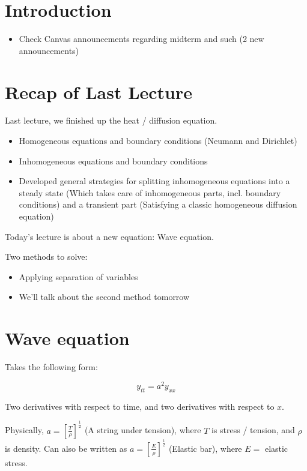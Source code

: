 \graphicspath{{./Lecture11/}}

\section{Introduction}

\begin{itemize}
    \item Check Canvas announcements regarding midterm and such (2 new announcements)
\end{itemize}

\section{Recap of Last Lecture}

Last lecture, we finished up the heat / diffusion equation. 

\begin{itemize}
    \item Homogeneous equations and boundary conditions (Neumann and Dirichlet)
    \item Inhomogeneous equations and boundary conditions
    \item Developed general strategies for splitting inhomogeneous equations into a steady state (Which takes care of inhomogeneous parts, incl. boundary conditions) and a transient part (Satisfying a classic homogeneous diffusion equation)
\end{itemize}

\hfill

Today's lecture is about a new equation: Wave equation. 

Two methods to solve:

\begin{itemize}
    \item Applying separation of variables
    \item We'll talk about the second method tomorrow
\end{itemize}

\section{Wave equation}

Takes the following form:

$$y_{tt} = a^2 y_{xx}$$

Two derivatives with respect to time, and two derivatives with respect to $x$. 

Physically, $a = \left[ \frac{T}{\rho} \right]^{\frac{1}{2}}$ (A string under tension), where $T$ is stress / tension, and $\rho$ is density. Can also be written as $a = \left[ \frac{E}{\rho} \right]^{\frac{1}{2}}$ (Elastic bar), where $E = $ elastic stress. 

